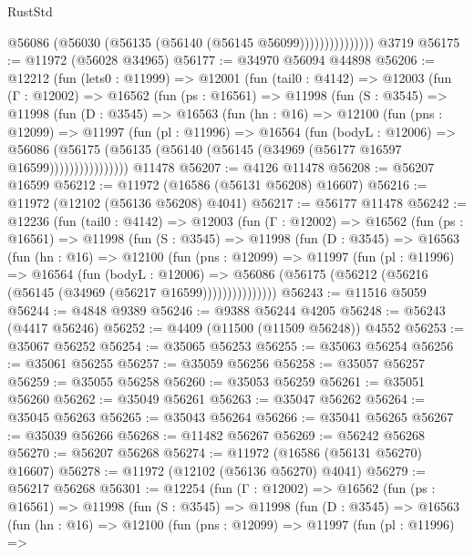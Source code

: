 \begin{lexlean}{RustStd}
\begin{coremodule}
                        @56086 (@56030 (@56135 (@56140 (@56145 @56099)))))))))))))))
    @3719
@56175 := @11972 (@56028 @34965)
@56177 := @34970 @56094 @44898
@56206 := @12212
    (fun (lets0 : @11999) =>
    @12001
      (fun (tail0 : @4142) =>
      @12003
        (fun (Γ : @12002) =>
        @16562
          (fun (ps : @16561) =>
          @11998
            (fun (S : @3545) =>
            @11998
              (fun (D : @3545) =>
              @16563
                (fun (hn : @16) =>
                @12100
                  (fun (pns : @12099) =>
                  @11997
                    (fun (pl : @11996) =>
                    @16564
                      (fun (bodyL : @12006) =>
                      @56086
                        (@56175
                          (@56135 (@56140 (@56145 (@34969 (@56177 @16597 @16599))))))))))))))))
    @11478
@56207 := @4126 @11478
@56208 := @56207 @16599
@56212 := @11972 (@16586 (@56131 @56208) @16607)
@56216 := @11972 (@12102 (@56136 @56208) @4041)
@56217 := @56177 @11478
@56242 := @12236
    (fun (tail0 : @4142) =>
    @12003
      (fun (Γ : @12002) =>
      @16562
        (fun (ps : @16561) =>
        @11998
          (fun (S : @3545) =>
          @11998
            (fun (D : @3545) =>
            @16563
              (fun (hn : @16) =>
              @12100
                (fun (pns : @12099) =>
                @11997
                  (fun (pl : @11996) =>
                  @16564
                    (fun (bodyL : @12006) =>
                    @56086 (@56175 (@56212 (@56216 (@56145 (@34969 (@56217 @16599)))))))))))))))
@56243 := @11516 @5059
@56244 := @4848 @9389
@56246 := @9388 @56244 @4205
@56248 := @56243 (@4417 @56246)
@56252 := @4409 (@11500 (@11509 @56248)) @4552
@56253 := @35067 @56252
@56254 := @35065 @56253
@56255 := @35063 @56254
@56256 := @35061 @56255
@56257 := @35059 @56256
@56258 := @35057 @56257
@56259 := @35055 @56258
@56260 := @35053 @56259
@56261 := @35051 @56260
@56262 := @35049 @56261
@56263 := @35047 @56262
@56264 := @35045 @56263
@56265 := @35043 @56264
@56266 := @35041 @56265
@56267 := @35039 @56266
@56268 := @11482 @56267
@56269 := @56242 @56268
@56270 := @56207 @56268
@56274 := @11972 (@16586 (@56131 @56270) @16607)
@56278 := @11972 (@12102 (@56136 @56270) @4041)
@56279 := @56217 @56268
@56301 := @12254
    (fun (Γ : @12002) =>
    @16562
      (fun (ps : @16561) =>
      @11998
        (fun (S : @3545) =>
        @11998
          (fun (D : @3545) =>
          @16563
            (fun (hn : @16) =>
            @12100
              (fun (pns : @12099) =>
              @11997
                (fun (pl : @11996) =>

\end{coremodule}
\end{lexlean}
